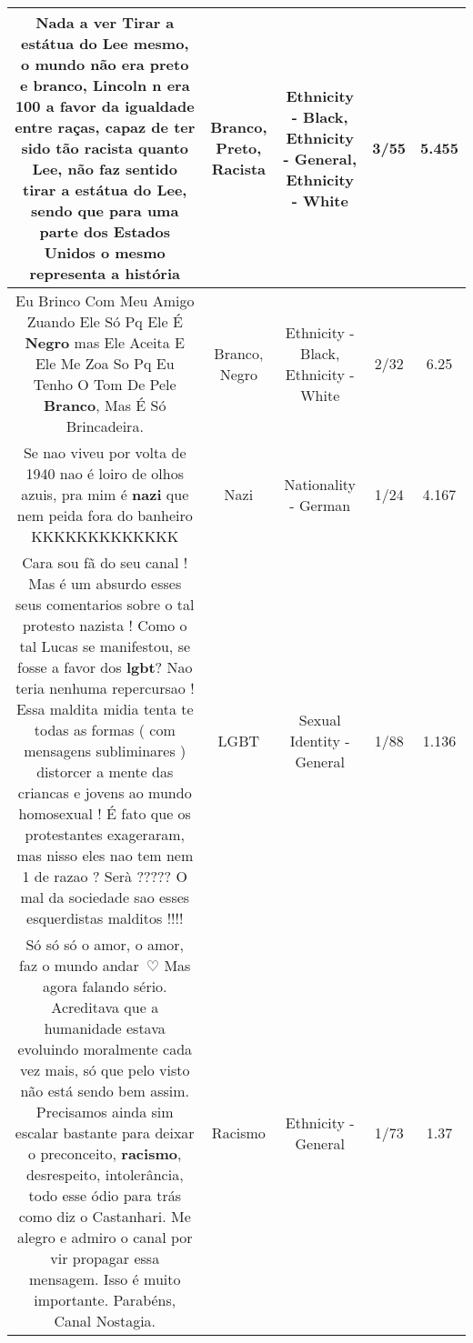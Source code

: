 \documentclass[11pt]{article}
\newlength\mylength
\begin{document}
\begin{center}
\begin{longtable}{|C{.65\mylength}|C{.30\mylength}|C{.12\mylength}|C{.12\mylength}|C{.12\mylength}|}
  \small Nada a ver Tirar a estátua do Lee mesmo, o mundo não era \textbf{preto} e \textbf{branco}, Lincoln n era 100 a favor da igualdade entre raças, capaz de ter sido tão \textbf{racista} quanto Lee, não faz sentido tirar a estátua do Lee, sendo que para uma parte dos Estados Unidos o mesmo representa a história\normalsize   & Branco, Preto, Racista & Ethnicity - Black, Ethnicity - General, Ethnicity - White & 3/55 & 5.455 \\  \hline
  \small Eu Brinco Com Meu Amigo Zuando Ele Só Pq Ele É \textbf{Negro} mas Ele Aceita E Ele Me Zoa So Pq Eu Tenho O Tom De Pele \textbf{Branco}, Mas É Só Brincadeira.\normalsize   & Branco, Negro & Ethnicity - Black, Ethnicity - White & 2/32 & 6.25 \\  \hline
  \small Se nao viveu por volta de 1940 nao é loiro de olhos azuis, pra mim é \textbf{nazi} que nem peida fora do banheiro KKKKKKKKKKKKK\normalsize   & Nazi & Nationality - German & 1/24 & 4.167 \\  \hline
  \small Cara sou fã do seu canal ! Mas é um absurdo esses seus comentarios sobre o tal protesto nazista ! Como o tal Lucas se manifestou, se fosse a favor dos \textbf{lgbt}? Nao teria nenhuma repercursao ! Essa maldita midia tenta te todas as formas ( com mensagens subliminares ) distorcer a mente das criancas e jovens ao mundo homosexual ! É fato que os protestantes exageraram, mas nisso eles nao tem nem 1 de razao ? Serà ????? O mal da sociedade sao esses esquerdistas malditos !!!!\normalsize   & LGBT & Sexual Identity - General & 1/88 & 1.136 \\  \hline
  \small Só só só o amor, o amor, faz o mundo andar~♡ Mas agora falando sério. Acreditava que a humanidade estava evoluindo moralmente cada vez mais, só que pelo visto não está sendo bem assim. Precisamos ainda sim escalar bastante para deixar o preconceito, \textbf{racismo}, desrespeito, intolerância, todo esse ódio para trás como diz o Castanhari. Me alegro e admiro o canal por vir propagar essa mensagem. Isso é muito importante. Parabéns, Canal Nostagia.\normalsize   & Racismo & Ethnicity - General & 1/73 & 1.37 \\  \hline

\end{longtable}
\end{center}
\end{document}
